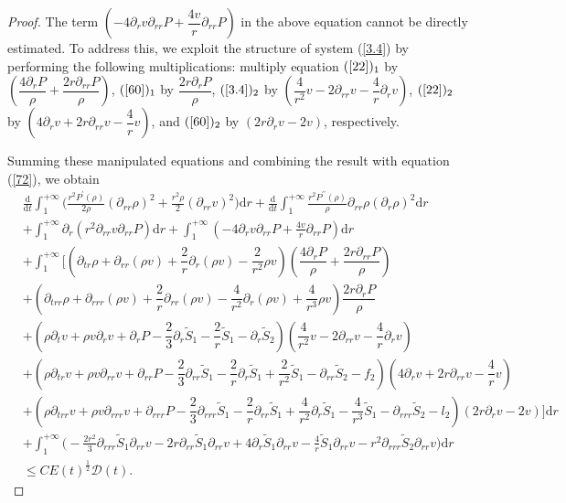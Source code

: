 \documentclass[10pt,reqno]{amsart}
\numberwithin{equation}{section}
\begin{document}
\begin{proof}
		
		The term \((-4\partial_{r}v\partial_{rr}P+\dfrac{4 v}{r}\partial_{rr}P)\) in the above equation cannot be directly estimated. To address this, we exploit the structure of system (\ref{3.4}) by performing the following multiplications:
		multiply equation $(\ref{22})_1$ by $(\dfrac{4\partial_r P}{\rho} + \dfrac{2r\partial_{rr}P}{\rho})$, $(\ref{60})_1$ by $\dfrac{2r\partial_r P}{\rho}$,  $(\ref{3.4})_2$ by $(\dfrac{4}{r^2}v - 2\partial_{rr}v - \dfrac{4}{r}\partial_r v)$,  $(\ref{22})_2$ by $(4\partial_r v + 2r\partial_{rr}v - \dfrac{4}{r}v)$, and $(\ref{60})_2$ by $(2r\partial_r v - 2v)$, respectively. 
		
		Summing these manipulated equations and combining the result with equation (\ref{72}), we obtain
			\begin{align}\label{3.81}
				&\frac{\mathrm{d}}{\mathrm{d} t}\int_{1}^{+\infty}\bigg(\frac{r^2 P^{\prime}(\rho)}{2\rho} \left(\partial_{rr} \rho\right)^2
				+\frac{r^2\rho}{2} (\partial_{rr}v)^2\bigg)\mathrm{d}r
				+\frac{\mathrm{d}}{\mathrm{d} t}\int_{1}^{+\infty}\frac{r^2 P^{\prime\prime}(\rho)}{\rho} \partial_{rr} \rho(\partial_{r}\rho)^2\mathrm{d}r
				 \nonumber \\
				&+\int_{1}^{+\infty}\partial_{r}(r^2 \partial_{rr}v\partial_{rr}P)\mathrm{d}r
				+\int_{1}^{+\infty}(-4\partial_{r}v\partial_{rr}P+\frac{4 v}{r}\partial_{rr}P)\mathrm{d}r \nonumber\\
				&+\int_{1}^{+\infty}\bigg[\left(\partial_{tr}\rho+\partial_{rr}(\rho v)+\dfrac{2}{r} \partial_r(\rho v)-\dfrac{2}{r^2} \rho v\right)(\dfrac{4\partial_{r}{P}}{\rho}+\dfrac{2r\partial_{rr}{P}}{\rho}) \nonumber\\
				&+\left(\partial_{trr}\rho+\partial_{rrr}(\rho v)+\dfrac{2}{r} \partial_{rr}(\rho v)-\dfrac{4}{r^2} \partial_{r}(\rho v)+\dfrac{4}{r^3}\rho v\right) \dfrac{2r\partial_{r}{P}}{\rho} \nonumber\\
				&+\left(\rho\partial_{t}v+\rho v \partial_r v+\partial_r P-\dfrac{2}{3}\partial_r \tilde{S}_1-\dfrac{2}{r} \tilde{S}_1-\partial_r \tilde{S}_2\right)(\dfrac{4}{r^2}v-2\partial_{rr}v-\dfrac{4}{r}\partial_{r}v) \nonumber\\
				&+\left(\rho\partial_{tr}v+\rho v \partial_{rr} v+\partial_{rr} P-\dfrac{2}{3}\partial_{rr}  \tilde{S}_1-\dfrac{2}{r} \partial_r \tilde{S}_1+\dfrac{2}{r^2}\tilde{S}_1-\partial_{rr} \tilde{S}_2-f_2\right)(4\partial_{r}v+2r\partial_{rr}v-\dfrac{4}{r}v) \nonumber\\
				&+\left(\rho\partial_{trr}v+\rho v \partial_{rrr} v+\partial_{rrr} P-\dfrac{2}{3}\partial_{rrr}  \tilde{S}_1-\dfrac{2}{r} \partial_{rr} \tilde{S}_1+\dfrac{4}{r^2}\partial_{r}\tilde{S}_1-\dfrac{4}{r^3}\tilde{S}_1-\partial_{rrr} \tilde{S}_2-l_2\right)
				(2r\partial_{r}v-2v)\bigg]\mathrm{d}r \nonumber\\
				&+\int_{1}^{+\infty}\bigg(-\frac{2 r^2}{3} \partial_{rrr}\tilde{S}_1 \partial_{rr}v-2r\partial_{rr}\tilde{S}_1\partial_{rr}v+4\partial_{r}\tilde{S}_1  \partial_{rr}v-\frac{4}{r}\tilde{S}_1\partial_{rr}v
				-r^2 \partial_{rrr}\tilde{S}_2 \partial_{rr}v\bigg)\mathrm{d}r \nonumber\\
				&\leq C E(t)^{\frac{1}{2}}\mathcal{D}(t).
			\end{align}
		

\end{proof}
\end{document}
